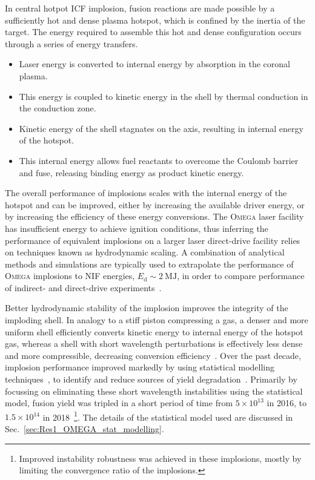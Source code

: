 In central hotpot \ac{ICF} implosion, fusion reactions are made possible by a sufficiently hot and dense plasma hotspot, which is confined by the inertia of the target.
The energy required to assemble this hot and dense configuration occurs through a series of energy transfers.
\begin{itemize}
    \item Laser energy is converted to internal energy by absorption in the coronal plasma.
    \item This energy is coupled to kinetic energy in the shell by thermal conduction in the conduction zone.
    \item Kinetic energy of the shell stagnates on the axis, resulting in internal energy of the hotspot.
    \item This internal energy allows fuel reactants to overcome the Coulomb barrier and fuse, releasing binding energy as product kinetic energy.
\end{itemize}
The overall performance of implosions scales with the internal energy of the hotspot and can be improved, either by increasing the available driver energy, or by increasing the efficiency of these energy conversions.
The \textsc{Omega} laser facility has insufficient energy to achieve ignition conditions, thus inferring the performance of equivalent implosions on a larger laser direct-drive facility relies on techniques known as hydrodynamic scaling.
A combination of analytical methods and simulations are typically used to extrapolate the performance of \textsc{Omega} implosions to \ac{NIF} energies, $E_{\text{d}}\sim2\ \text{MJ}$, in order to compare performance of indirect- and direct-drive experiments~\cite{zhou_hydrodynamic_2007}.

Better hydrodynamic stability of the implosion improves the integrity of the imploding shell.
In analogy to a stiff piston compressing a gas, a denser and more uniform shell efficiently converts kinetic energy to internal energy of the hotspot gas, whereas a shell with short wavelength perturbations is effectively less dense and more compressible, decreasing conversion efficiency~\cite{betti_deceleration_2002}.
Over the past decade, implosion performance improved markedly by using statistical modelling techniques~\cite{lees_experimentally_2021}, to identify and reduce sources of yield degradation~\cite{lees_understanding_2023}.
Primarily by focussing on eliminating these short wavelength instabilities using the statistical model, fusion yield was tripled in a short period of time from $5\times10^{13}$ in 2016, to $1.5\times10^{14}$ in 2018~\cite{gopalaswamy_tripled_2019}\footnote{Improved instability robustness was achieved in these implosions, mostly by limiting the convergence ratio of the implosions.}.
The details of the statistical model used are discussed in Sec.~\ref{sec:Res1_OMEGA_stat_modelling}.

